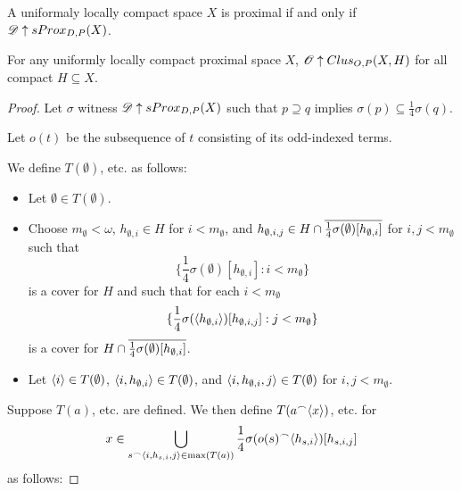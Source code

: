\begin{corollary}
  A uniformaly locally compact space $X$ is proximal if and only if $\mathscr{D} \uparrow sProx_{D,P}(X)$.
\end{corollary}

\begin{theorem}
  For any uniformly locally compact proximal space $X$, $\mathscr{O}\uparrow Clus_{O,P}(X,H)$ for all compact $H\subseteq X$.
\end{theorem}

\begin{proof}
  Let $\sigma$ witness $\mathscr{D} \uparrow sProx_{D,P}(X)$ such that $p\supseteq q$ implies $\sigma(p)\subseteq \frac{1}{4}\sigma(q)$.

  Let $o(t)$ be the subsequence of $t$ consisting of its odd-indexed terms.

  We define $T(\emptyset)$, etc. as follows:

  \begin{itemize}
    \item Let $\emptyset\in T(\emptyset)$.
    \item Choose $m_\emptyset<\omega$, $h_{\emptyset,i}\in H$ for $i<m_\emptyset$, and $h_{\emptyset,i,j}\in H\cap\overline{\frac{1}{4}\sigma(\emptyset)[h_{\emptyset,i}]}$ for $i,j<m_\emptyset$ such that
      \[
        \{\frac{1}{4}\sigma(\emptyset)[h_{\emptyset,i}]:i<m_\emptyset\}
      \]
    is a cover for $H$ and such that for each $i<m_\emptyset$
      \[
        \{\frac{1}{4}\sigma(\langle h_{\emptyset,i}\rangle)[h_{\emptyset,i,j}]:j<m_\emptyset\}
      \]
    is a cover for $H\cap\overline{\frac{1}{4}\sigma(\emptyset)[h_{\emptyset,i}]}$.
    \item Let $\langle i\rangle\in T(\emptyset)$, $\langle i,h_{\emptyset,i}\rangle\in T(\emptyset)$, and $\langle i,h_{\emptyset,i},j\rangle\in T(\emptyset)$ for $i,j<m_\emptyset$.
  \end{itemize}

  Suppose $T(a)$, etc. are defined. We then define $T(a^\frown\langle x\rangle)$, etc. for
    \[
      x\in \bigcup_{s^\frown\langle i,h_{s,i},j\rangle\in\max(T(a))} \frac{1}{4}\sigma(o(s)^\frown\langle h_{s,i}\rangle)[h_{s,i,j}]
    \]
  as follows:


\end{proof}
